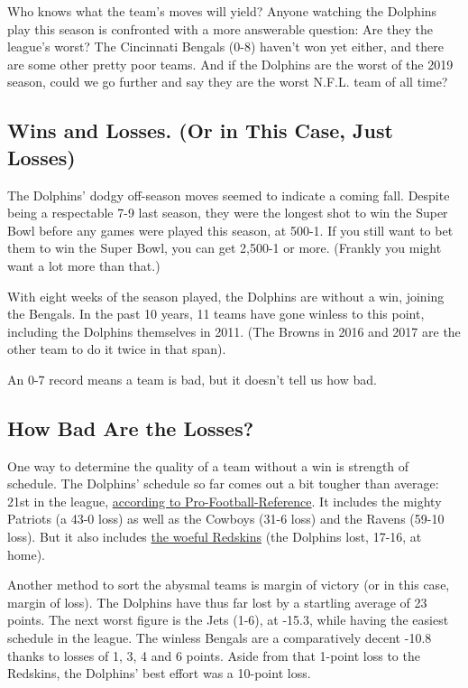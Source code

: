 Who knows what the team's moves will yield? Anyone watching the Dolphins
play this season is confronted with a more answerable question: Are they
the league's worst? The Cincinnati Bengals (0-8) haven't won yet either,
and there are some other pretty poor teams. And if the Dolphins are the
worst of the 2019 season, could we go further and say they are the worst
N.F.L. team of all time?

\hypertarget{wins-and-losses-or-in-this-case-just-losses}{%
\subsection{Wins and Losses. (Or in This Case, Just
Losses)}\label{wins-and-losses-or-in-this-case-just-losses}}

The Dolphins' dodgy off-season moves seemed to indicate a coming fall.
Despite being a respectable 7-9 last season, they were the longest shot
to win the Super Bowl before any games were played this season, at
500-1. If you still want to bet them to win the Super Bowl, you can get
2,500-1 or more. (Frankly you might want a lot more than that.)

With eight weeks of the season played, the Dolphins are without a win,
joining the Bengals. In the past 10 years, 11 teams have gone winless to
this point, including the Dolphins themselves in 2011. (The Browns in
2016 and 2017 are the other team to do it twice in that span).

An 0-7 record means a team is bad, but it doesn't tell us how bad.

\hypertarget{how-bad-are-the-losses}{%
\subsection{How Bad Are the Losses?}\label{how-bad-are-the-losses}}

One way to determine the quality of a team without a win is strength of
schedule. The Dolphins' schedule so far comes out a bit tougher than
average: 21st in the league,
\href{https://www.pro-football-reference.com/years/2019/}{according to
Pro-Football-Reference}. It includes the mighty Patriots (a 43-0 loss)
as well as the Cowboys (31-6 loss) and the Ravens (59-10 loss). But it
also includes
\href{https://www.nytimes3xbfgragh.onion/2019/10/13/sports/football/redskins-dolphins.html}{the
woeful Redskins} (the Dolphins lost, 17-16, at home).

Another method to sort the abysmal teams is margin of victory (or in
this case, margin of loss). The Dolphins have thus far lost by a
startling average of 23 points. The next worst figure is the Jets (1-6),
at -15.3, while having the easiest schedule in the league. The winless
Bengals are a comparatively decent -10.8 thanks to losses of 1, 3, 4 and
6 points. Aside from that 1-point loss to the Redskins, the Dolphins'
best effort was a 10-point loss.

